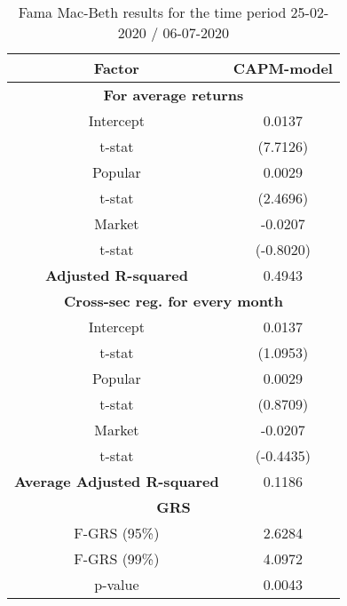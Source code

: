 \begin{table}[h!]
	\centering
	\captionsetup{skip=0.5\baselineskip}
	\caption{Fama Mac-Beth results for the time period 25-02-2020 / 06-07-2020}
	\begin{tabular}{|c|c|}
		\hline
		\textbf{Factor} & \textbf{CAPM-model} \\ \hline
		\multicolumn{2}{|c|}{\textbf{For average returns}} \\ \hline
		Intercept & 0.0137 \\ 
		t-stat & (7.7126) \\ \hline
		Popular & 0.0029 \\ 
		t-stat & (2.4696)\\ \hline
		Market & -0.0207 \\
		t-stat & (-0.8020)\\ \hline
		\textbf{Adjusted R-squared} & 0.4943 \\ \hline
		\multicolumn{2}{|c|}{\textbf{Cross-sec reg. for every month}} \\ \hline
		Intercept & 0.0137 \\ 
		t-stat & (1.0953) \\ \hline
		Popular & 0.0029 \\ 
		t-stat & (0.8709)\\ \hline
		Market & -0.0207 \\
		t-stat & (-0.4435)\\ \hline
		\textbf{Average Adjusted R-squared} & 0.1186 \\ \hline
		\multicolumn{2}{|c|}{\textbf{GRS}} \\ \hline
		F-GRS (95\%) & 2.6284 \\ \hline
		F-GRS (99\%) & 4.0972 \\ \hline
		p-value & 0.0043 \\ \hline
	\end{tabular}
\end{table}

